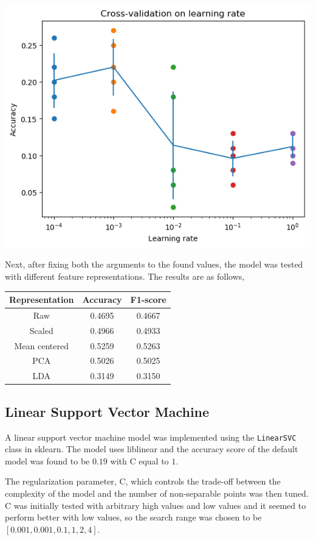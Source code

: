 \documentclass[12pt]{article}
\begin{document}
\begin{center}
\includegraphics[scale=0.6]{mlp-lr.png}
\end{center}

Next, after fixing both the arguments to the found values, the model was tested with different feature representations. The results are as follows,

\begin{center}
  \begin{tabular}{|c|c|c|}
    \hline
    Representation & Accuracy & F1-score \\
    \hline
    Raw & 0.4695 & 0.4667\\
    Scaled & 0.4966 & 0.4933 \\
    Mean centered & 0.5259 & 0.5263\\
    PCA & 0.5026 & 0.5025\\
    LDA & 0.3149 & 0.3150 \\
    \hline
  \end{tabular}
\end{center}


\subsection*{Linear Support Vector Machine}

A linear support vector machine model was implemented using the \texttt{LinearSVC} class in sklearn. The model uses liblinear and the accuracy score of the default model was found to be $0.19$ with C equal to $1$.

The regularization parameter, C, which controls the trade-off between the complexity of the model and the number of non-separable points was then tuned. C was initially tested with arbitrary high values and low values and it seemed to perform better with low values, so the search range was chosen to be $[0.001,0.001,0.1,1,2,4]$.
\end{document}
